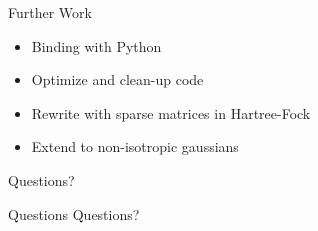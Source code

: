 \documentclass[10pt, t]{beamer}
\begin{document}
\begin{frame}[fragile]{Further Work}
    \begin{itemize}[<+->]
        \item Binding with Python
        \item Optimize and clean-up code 
        \item Rewrite with sparse matrices in Hartree-Fock 
        \item Extend to non-isotropic gaussians
    \end{itemize}
\end{frame}

{
\begin{frame}[standout]
  Questions?
\end{frame}}

\appendix

{
\begin{frame}[standout]{Questions}
    Questions?
\end{frame}}
\end{document}
